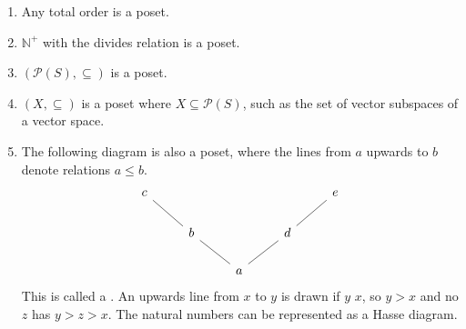 \begin{example}
    \begin{enumerate}
        \item Any total order is a poset.
        \item $\mathbb N^+$ with the divides relation is a poset.
        \item $(\mathcal P(S), \subseteq)$ is a poset.
        \item $(X, \subseteq)$ is a poset where $X \subseteq \mathcal P(S)$, such as the set of vector subspaces of a vector space.
\item The following diagram is also a poset, where the lines from $a$ upwards to $b$ denote relations $a \leq b$.
\[\begin{tikzcd}
	c &&&& e \\
	& b && d \\
	&& a
	\arrow[no head, from=3-3, to=2-2]
	\arrow[no head, from=2-2, to=1-1]
	\arrow[no head, from=3-3, to=2-4]
	\arrow[no head, from=2-4, to=1-5]
\end{tikzcd}\]
This is called a .
An upwards line from $x$ to $y$ is drawn if $y$  $x$, so $y > x$ and no $z$ has $y > z > x$.
The natural numbers can be represented as a Hasse diagram.


\end{enumerate}
\end{example}
